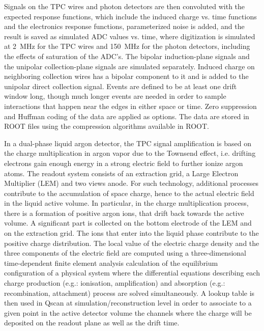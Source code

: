 Signals on the TPC wires and photon detectors are then convoluted with
the expected response functions, which include the induced charge
vs. time functions and the electronics response functions,
parameterized noise is added, and the result is saved as simulated ADC
values vs. time, where digitization is simulated at 2~MHz for the TPC
wires and 150~MHz for the photon detectors, including the effects of
saturation of the ADC's.  The bipolar induction-plane signals and the
unipolar collection-plane signals are simulated separately.  Induced
charge on neighboring collection wires has a bipolar component to it
and is added to the unipolar direct collection signal.  Events are
defined to be at least one drift window long, though much longer
events are needed in order to sample interactions that happen near the
edges in either space or time.  Zero suppression and Huffman coding of
the data are applied as options.  The data are stored in ROOT files
using the compression algorithms available in ROOT.


In a dual-phase liquid argon detector, the TPC signal amplification 
is based on the charge multiplication in argon vapor due to the Townsend effect, 
i.e. drifting electrons gain enough energy in a strong electric field to further ionize argon atoms. 
The readout system consists of an extraction grid, a Large Electron Multiplier (LEM) and two views anode.
For such technology, additional processes contribute to the
accumulation of space charge, hence to the actual electric field in the liquid active volume.
In particular, in the charge multiplication process, there is a formation of positive argon ions, 
that drift back towards the active volume. 
A significant part is collected on the bottom electrode of the LEM and on the extraction grid. 
The ions that enter into the liquid phase contribute to the positive charge distribution.
The local value of the electric charge density and the three components of the electric field
are computed using a three-dimensional time-dependent finite element analysis calculation of the equilibrium 
configuration of a physical system where the differential equations describing each charge production (e.g.: ionisation, amplification) and
absorption (e.g.: recombination, attachment) process are solved simultaneously. 
A lookup table is then used in Qscan at simulation/reconstruction level in order to associate to a given point in the active
detector volume the channels where the charge will be deposited on the readout plane as well as the drift time.

